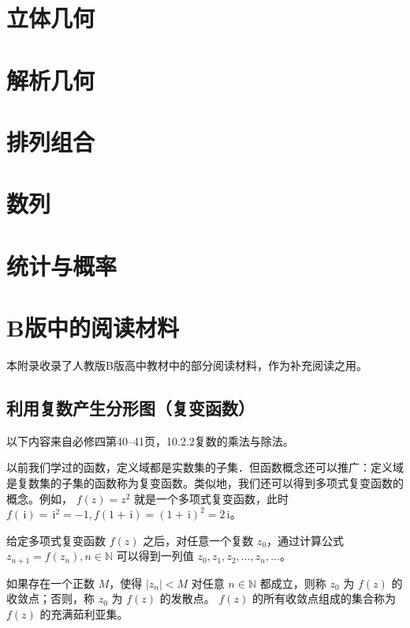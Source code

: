 \documentclass[a4paper,openany]{ctexbook}
\newcommand{\ii}{\,\mathrm{i}}
\begin{document}
\chapter{立体几何}

\chapter{解析几何}

\chapter{排列组合}

\chapter{数列}

\chapter{统计与概率}

\appendix

\chapter{B版中的阅读材料}

本附录收录了人教版B版高中教材中的部分阅读材料，作为补充阅读之用。

\section{利用复数产生分形图（复变函数）}

以下内容来自必修四第40--41页，10.2.2复数的乘法与除法。\vspace{1em}

以前我们学过的函数，定义域都是实数集的子集．但函数概念还可以推广：定义域是复数集的子集的函数称为复变函数。类似地，我们还可以得到多项式复变函数的概念。例如，%
\(f(z)=z^2\) 就是一个多项式复变函数，此时 \(f(\ii)=\ii^2=-1,f(1+\ii)=(1+\ii)^2=2\ii\)。

给定多项式复变函数 \(f(z)\) 之后，对任意一个复数 \(z_0\)，通过计算公式 \(z_{n+1}=f(z_n),n\in \mathbb{N}\) 可以得到一列值 \(z_0,z_1,z_2,\dots,z_n,\dots\)。

如果存在一个正数 \(M\)，使得 \(|z_n|<M\) 对任意 \(n\in \mathbb{N}\) 都成立，则称 \(z_0\) 为 \(f(z)\) 的收敛点；否则，称 \(z_0\) 为 \(f(z)\) 的发散点。%
\(f(z)\) 的所有收敛点组成的集合称为 \(f(z)\) 的充满茹利亚集。
\end{document}
